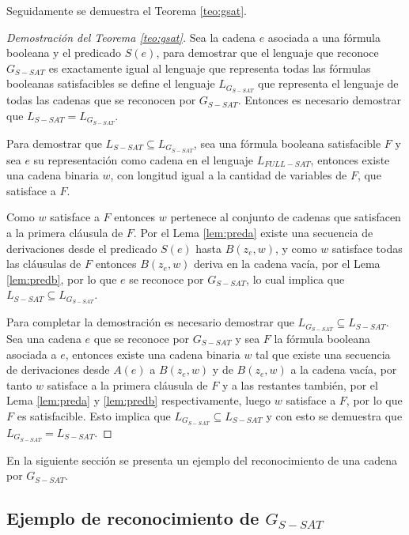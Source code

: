 Seguidamente se demuestra el Teorema \ref{teo:gsat}.

\begin{proof}[Demostración del Teorema \ref{teo:gsat}]
    Sea la cadena $e$ asociada a una fórmula booleana y el predicado $S(e)$, para demostrar que el lenguaje que reconoce $G_{S-SAT}$ es exactamente igual al lenguaje que representa todas las fórmulas booleanas satisfacibles se define el lenguaje $L_{G_{S-SAT}}$ que representa el lenguaje de todas las cadenas que se reconocen por $G_{S-SAT}$. Entonces es necesario demostrar que $L_{S-SAT}=L_{G_{S-SAT}}$.
    
    Para demostrar que $L_{S-SAT}\subseteq L_{G_{S-SAT}}$, sea una fórmula booleana satisfacible $F$ y sea $e$ su representación como cadena en el lenguaje $L_{FULL-SAT}$, entonces existe una cadena binaria $w$, con longitud igual a la cantidad de variables de $F$, que satisface a $F$.
    
    Como $w$ satisface a $F$ entonces $w$ pertenece al conjunto de cadenas que satisfacen a la primera cláusula de $F$. Por el Lema \ref{lem:preda} existe una secuencia de derivaciones desde el predicado $S(e)$ hasta $B(z_e,w)$, y como $w$ satisface todas las cláusulas de $F$ entonces $B(z_e,w)$ deriva en la cadena vacía, por el Lema \ref{lem:predb}, por lo que $e$ se reconoce por $G_{S-SAT}$, lo cual implica que $L_{S-SAT}\subseteq L_{G_{S-SAT}}$.
    
    Para completar la demostración es necesario demostrar que $ L_{G_{S-SAT}}\subseteq L_{S-SAT}$. Sea una cadena $e$ que se reconoce por $G_{S-SAT}$ y sea $F$ la fórmula booleana asociada a $e$, entonces existe una cadena binaria $w$ tal que existe una secuencia de derivaciones desde $A(e)$ a $B(z_e,w)$ y de $B(z_e,w)$ a la cadena vacía, por tanto $w$ satisface a la primera cláusula de $F$ y a las restantes también, por el Lema \ref{lem:preda} y \ref{lem:predb} respectivamente, luego $w$ satisface a $F$, por lo que $F$ es satisfacible. Esto implica que $L_{G_{S-SAT}}\subseteq L_{S-SAT}$ y con esto se demuestra que $L_{G_{S-SAT}}= L_{S-SAT}$.
\end{proof}


En la siguiente sección se presenta un ejemplo del reconocimiento de una cadena por $G_{S-SAT}$.

\subsection{Ejemplo de reconocimiento de $G_{S-SAT}$}


